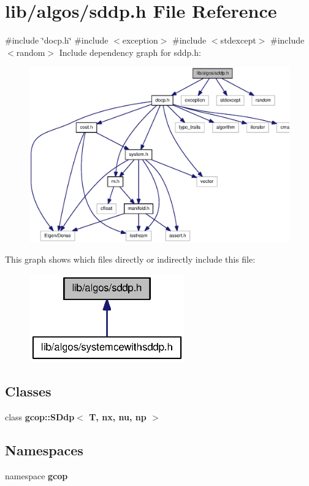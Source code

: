 \section{lib/algos/sddp.h \-File \-Reference}
\label{sddp_8h}
{\ttfamily \#include \char`\"{}docp.\-h\char`\"{}}\*
{\ttfamily \#include $<$exception$>$}\*
{\ttfamily \#include $<$stdexcept$>$}\*
{\ttfamily \#include $<$random$>$}\*
\-Include dependency graph for sddp.\-h\-:
\nopagebreak
\begin{figure}[H]
\begin{center}
\leavevmode
\includegraphics[width=350pt]{sddp_8h__incl}
\end{center}
\end{figure}
\-This graph shows which files directly or indirectly include this file\-:
\nopagebreak
\begin{figure}[H]
\begin{center}
\leavevmode
\includegraphics[width=190pt]{sddp_8h__dep__incl}
\end{center}
\end{figure}
\subsection*{\-Classes}
\begin{DoxyCompactItemize}
\item 
class {\bf gcop\-::\-S\-Ddp$<$ T, nx, nu, np $>$}
\end{DoxyCompactItemize}
\subsection*{\-Namespaces}
\begin{DoxyCompactItemize}
\item 
namespace {\bf gcop}
\end{DoxyCompactItemize}
